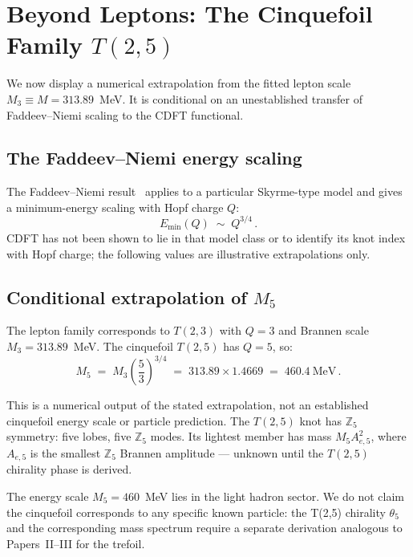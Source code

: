 \documentclass[11pt]{article}
\begin{document}
\section{Beyond Leptons: The Cinquefoil Family $T(2,5)$}
\label{sec:cinquefoil}

We now display a numerical extrapolation from the fitted lepton scale
$M_3 \equiv M = 313.89$~MeV. It is conditional on an unestablished transfer of
Faddeev--Niemi scaling to the CDFT functional.

\subsection{The Faddeev--Niemi energy scaling}

The Faddeev--Niemi result~\cite{FaddeevNiemi1997} applies to a particular
Skyrme-type model and gives a minimum-energy scaling with Hopf charge $Q$:
\begin{equation}
  E_\text{min}(Q) \;\sim\; Q^{3/4}\,.
  \label{eq:FN_scaling}
\end{equation}
CDFT has not been shown to lie in that model class or to identify its knot index
with Hopf charge; the following values are illustrative extrapolations only.

\subsection{Conditional extrapolation of $M_5$}

The lepton family corresponds to $T(2,3)$ with $Q = 3$ and Brannen scale
$M_3 = 313.89$~MeV.
The cinquefoil $T(2,5)$ has $Q = 5$, so:
\begin{equation}
  M_5 \;=\; M_3 \left(\frac{5}{3}\right)^{3/4}
         \;=\; 313.89 \times 1.4669
         \;=\; 460.4~\text{MeV}\,.
  \label{eq:M5}
\end{equation}

This is a numerical output of the stated extrapolation, not an established
cinquefoil energy scale or particle prediction.
The $T(2,5)$ knot has $\mathbb{Z}_5$ symmetry: five lobes, five $\mathbb{Z}_5$
modes.
Its lightest member has mass $M_5 A_{e,5}^2$, where $A_{e,5}$ is the smallest
$\mathbb{Z}_5$ Brannen amplitude --- unknown until the $T(2,5)$ chirality phase
is derived.

The energy scale $M_5 = 460$~MeV lies in the light hadron sector.
We do not claim the cinquefoil corresponds to any specific known particle:
the T(2,5) chirality $\theta_5$ and the corresponding mass spectrum require a
separate derivation analogous to Papers~II--III for the trefoil.
\end{document}

